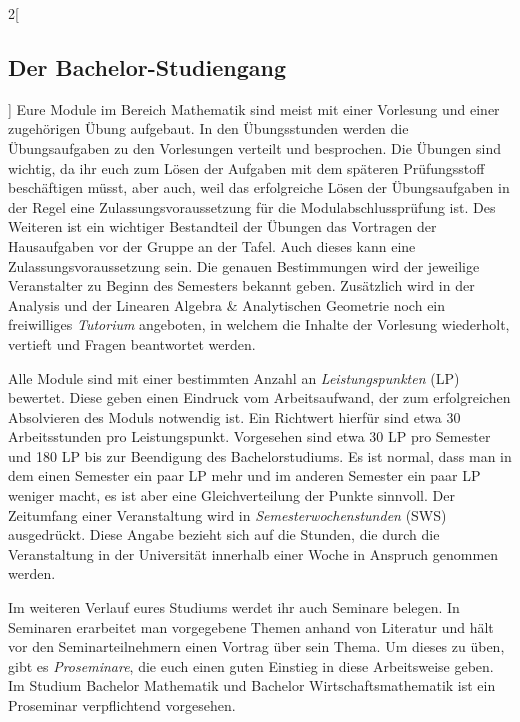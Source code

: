 \begin{multicols}{2}[\subsection{Der Bachelor-Studiengang}]
Eure Module im Bereich Mathematik sind meist mit einer Vorlesung und einer
zugehörigen Übung aufgebaut.  In den Übungsstunden werden die Übungsaufgaben zu
den Vorlesungen verteilt und besprochen.  Die Übungen sind wichtig, da ihr euch
zum Lösen der Aufgaben mit dem späteren Prüfungsstoff beschäftigen müsst, aber
auch, weil das erfolgreiche Lösen der Übungsaufgaben in der Regel eine
Zulassungsvoraussetzung für die Modulabschlussprüfung ist.  Des Weiteren ist
ein wichtiger Bestandteil der Übungen das Vortragen der Hausaufgaben vor der
Gruppe an der Tafel.  Auch dieses kann eine Zulassungsvoraussetzung sein. Die
genauen Bestimmungen wird der jeweilige Veranstalter zu Beginn des Semesters
bekannt geben.  Zusätzlich wird in der Analysis und der Linearen Algebra \&
Analytischen Geometrie noch ein freiwilliges \emph{Tutorium} angeboten, in
welchem die Inhalte der Vorlesung wiederholt, vertieft und Fragen beantwortet
werden.


Alle Module sind mit einer bestimmten Anzahl an \emph{Leistungspunkten} (LP)
bewertet. Diese geben einen Eindruck vom Arbeitsaufwand, der zum erfolgreichen
Absolvieren des Moduls notwendig ist. Ein Richtwert hierfür sind etwa 30
Arbeitsstunden pro Leistungspunkt.  Vorgesehen sind etwa 30 LP pro Semester und
180 LP bis zur Beendigung des Bachelorstudiums.  Es ist normal, dass man in dem
einen Semester ein paar LP mehr und im anderen Semester ein paar LP weniger
macht, es ist aber eine Gleichverteilung der Punkte sinnvoll.  Der Zeitumfang
einer Veranstaltung wird in \emph{Semesterwochenstunden} (SWS) ausgedrückt.
Diese Angabe bezieht sich auf die Stunden, die durch die Veranstaltung in der
Universität innerhalb einer Woche in Anspruch genommen werden.

Im weiteren Verlauf eures Studiums werdet ihr auch Seminare belegen.  In
Seminaren erarbeitet man vorgegebene Themen anhand von Literatur und hält vor
den Seminarteilnehmern einen Vortrag über sein Thema.  Um dieses zu üben, gibt
es \emph{Proseminare}, die euch einen guten Einstieg in diese Arbeitsweise
geben. Im Studium Bachelor Mathematik und Bachelor Wirtschaftsmathematik ist
ein Proseminar verpflichtend vorgesehen. 
\end{multicols}

\clearpage
